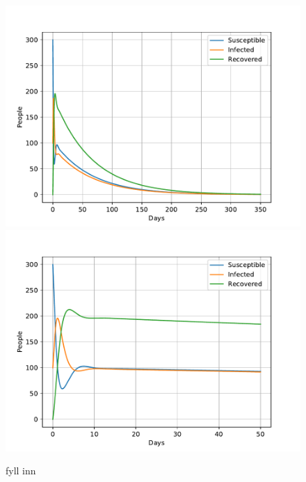 \documentclass[a4paper]{article}
\begin{document}
\begin{figure}[!htb]
	\includegraphics[scale=0.56]{../plots/opp_c_k2l.pdf}	
	\includegraphics[scale=0.56]{../plots/opp_c_k3.pdf} %
	\caption{fyll inn}
	\label{opp_c1}
\end{figure}
\end{document}
